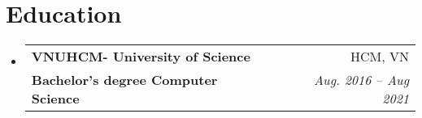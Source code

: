\documentclass[letterpaper,11pt]{article}
\makeatletter
\newcommand{\resumeItem}[1]{
  \item\small{
    {#1 \vspace{-2pt}}
  }
}
\newcommand{\resumeSubheading}[4]{
  \vspace{-2pt}\item
    \begin{tabular*}{0.97\textwidth}[t]{l@{\extracolsep{\fill}}r}
      \textbf{#1} & #2 \\
      \textbf{\small#3} & \textit{\small #4} \\
    \end{tabular*}\vspace{-7pt}
}
\newcommand{\resumeProjectHeading}[2]{
    \item
    \begin{tabular*}{0.97\textwidth}{l@{\extracolsep{\fill}}r}
      \small#1 & #2 \\
    \end{tabular*}\vspace{-7pt}
}
\newcommand{\resumeSubHeadingListStart}{\begin{itemize}[leftmargin=0.15in, label={}]}
\newcommand{\resumeSubHeadingListEnd}{\end{itemize}}
\newcommand{\resumeItemListStart}{\begin{itemize}}
\newcommand{\resumeItemListEnd}{\end{itemize}\vspace{-5pt}}
\makeatother
\begin{document}
\section{Education}
\resumeSubHeadingListStart
\resumeSubheading
{VNUHCM- University of Science}{HCM, VN}
{Bachelor's degree Computer Science}{Aug. 2016 -- Aug 2021}
\resumeSubHeadingListEnd



\end{document}

